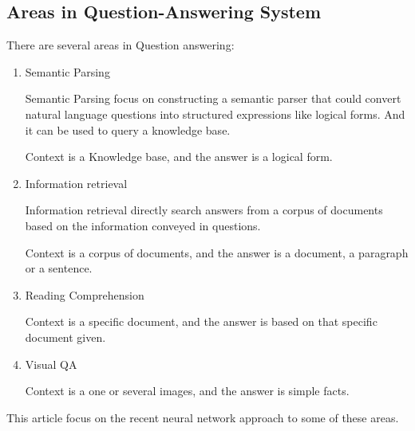 \documentclass[12pt]{article}
\numberwithin{equation}{section}
\begin{document}
\subsection{Areas in  Question-Answering System}
	There are several areas in Question answering:
	\begin{enumerate}
	\item Semantic Parsing\par
		Semantic Parsing focus on constructing a semantic parser that could convert natural language questions into structured expressions like logical forms. And it can be used to query a knowledge base.\par
		Context is a Knowledge base, and the answer is a logical form. \par
	\item Information retrieval \par
		Information retrieval directly search answers from a corpus of documents based on the information conveyed in questions. \par
		Context is a corpus of documents, and the answer is a document, a paragraph or a sentence.
	\item Reading Comprehension\par
		Context is a specific document, and the answer is based on that specific document given.
	\item Visual QA \par
		Context is a one or several images, and the answer is simple facts.
	\end{enumerate} \par
	This article focus on the recent neural network approach to some of these areas. \par
\end{document}
